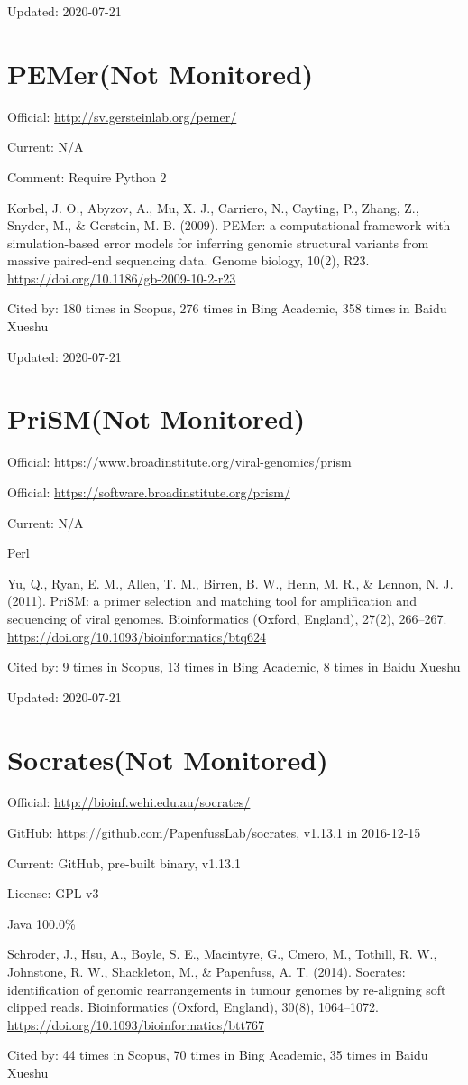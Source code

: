 \documentclass[]{article}
\newcommand{\nm}{{\color{red}(Not Monitored)}}
\newcommand{\cb}[3]{\par Cited by: {\color{blue}\Huge #1} times in Scopus, {\color{blue}\Huge #2} times in Bing Academic, {\color{blue}\Huge #3} times in Baidu Xueshu}
\begin{document}
Updated: 2020-07-21

\section{PEMer\nm}

Official: \url{http://sv.gersteinlab.org/pemer/}

Current: N/A

Comment: Require Python 2

Korbel, J. O., Abyzov, A., Mu, X. J., Carriero, N., Cayting, P., Zhang, Z., Snyder, M., \& Gerstein, M. B. (2009). PEMer: a computational framework with simulation-based error models for inferring genomic structural variants from massive paired-end sequencing data. Genome biology, 10(2), R23. \url{https://doi.org/10.1186/gb-2009-10-2-r23}\cb{180}{276}{358}

Updated: 2020-07-21

\section{PriSM\nm}

Official: \url{https://www.broadinstitute.org/viral-genomics/prism}

Official: \url{https://software.broadinstitute.org/prism/}

Current: N/A

Perl

Yu, Q., Ryan, E. M., Allen, T. M., Birren, B. W., Henn, M. R., \& Lennon, N. J. (2011). PriSM: a primer selection and matching tool for amplification and sequencing of viral genomes. Bioinformatics (Oxford, England), 27(2), 266–267. \url{https://doi.org/10.1093/bioinformatics/btq624}\cb{9}{13}{8}

Updated: 2020-07-21

\section{Socrates\nm}

Official: \url{http://bioinf.wehi.edu.au/socrates/}

GitHub: \url{https://github.com/PapenfussLab/socrates}, v1.13.1 in 2016-12-15

Current: GitHub, pre-built binary, v1.13.1

License: GPL v3

Java 100.0\%

Schroder, J., Hsu, A., Boyle, S. E., Macintyre, G., Cmero, M., Tothill, R. W., Johnstone, R. W., Shackleton, M., \& Papenfuss, A. T. (2014). Socrates: identification of genomic rearrangements in tumour genomes by re-aligning soft clipped reads. Bioinformatics (Oxford, England), 30(8), 1064–1072. \url{https://doi.org/10.1093/bioinformatics/btt767}\cb{44}{70}{35}
\end{document}
